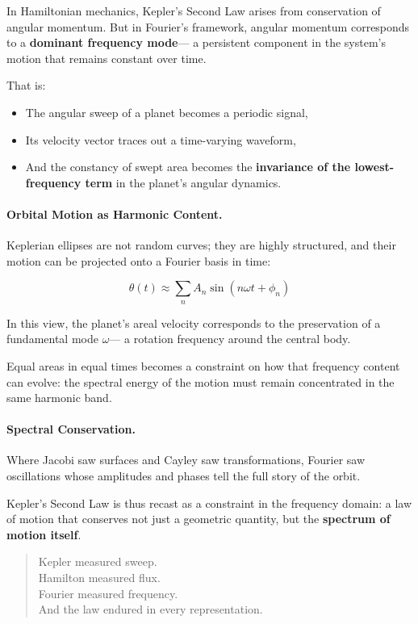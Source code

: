 In Hamiltonian mechanics, Kepler’s Second Law arises from conservation of angular momentum.  
But in Fourier’s framework, angular momentum corresponds to a \textbf{dominant frequency mode}—  
a persistent component in the system’s motion that remains constant over time.

That is:

\begin{itemize}
  \item The angular sweep of a planet becomes a periodic signal,
  \item Its velocity vector traces out a time-varying waveform,
  \item And the constancy of swept area becomes the \textbf{invariance of the lowest-frequency term} in the planet’s angular dynamics.
\end{itemize}

\bigskip

\paragraph{Orbital Motion as Harmonic Content.}

Keplerian ellipses are not random curves; they are highly structured,  
and their motion can be projected onto a Fourier basis in time:

\[
\theta(t) \approx \sum_{n} A_n \sin(n\omega t + \phi_n)
\]

In this view, the planet’s areal velocity corresponds to the preservation of a fundamental mode \( \omega \)—  
a rotation frequency around the central body.

Equal areas in equal times becomes a constraint on how that frequency content can evolve:  
the spectral energy of the motion must remain concentrated in the same harmonic band.

\bigskip

\paragraph{Spectral Conservation.}

Where Jacobi saw surfaces and Cayley saw transformations,  
Fourier saw oscillations whose amplitudes and phases tell the full story of the orbit.

Kepler’s Second Law is thus recast as a constraint in the frequency domain:  
a law of motion that conserves not just a geometric quantity,  
but the \textbf{spectrum of motion itself}.

\bigskip

\begin{quote}
Kepler measured sweep.\\
Hamilton measured flux.\\
Fourier measured frequency.\\
And the law endured in every representation.
\end{quote}
